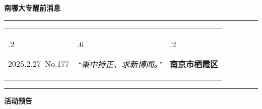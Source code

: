 \documentclass[letterpaper, 12pt]{article}
\begin{document}
\begin{center}
    \Huge\textbf{南哪大专醒前消息}
\end{center}
\vspace{4mm}
\hrule
\renewcommand\tabularxcolumn[1]{m{#1}}
\begin{tabularx}{\textwidth}{>{\hsize.2\hsize}X>{\hsize.6\hsize}X>{\hsize.2\hsize}X}
    \begin{flushleft}
        2025.2.27\, No.177
    \end{flushleft}
    &
    \begin{center}
        \textit{“秉中持正、求新博闻。”}
    \end{center}
    &
    \begin{flushright}
        \textbf{南京市栖霞区}
    \end{flushright}
\end{tabularx}
\vspace{-3.5mm}
\hrule
\vspace{4mm}
\centerline{\huge\textbf{活动预告}}
\end{document}
